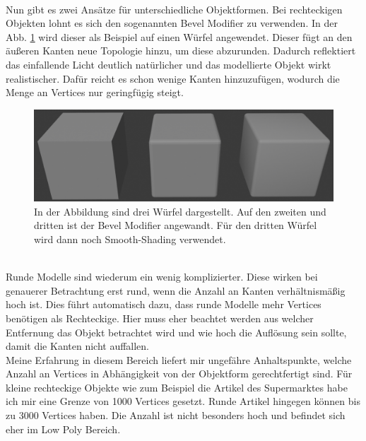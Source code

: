 \\
Nun gibt es zwei Ansätze für unterschiedliche Objektformen. Bei rechteckigen Objekten lohnt es sich den sogenannten \dq Bevel Modifier\dq{} zu verwenden. In der Abb. \ref{fig:bevel_cube} wird dieser als Beispiel auf einen Würfel angewendet. Dieser fügt an den äußeren Kanten neue Topologie hinzu, um diese abzurunden. Dadurch reflektiert das einfallende Licht deutlich natürlicher und das modellierte Objekt wirkt realistischer. Dafür reicht es schon wenige Kanten hinzuzufügen, wodurch die Menge an Vertices nur geringfügig steigt. 
\begin{figure} [ht]
	\centering
	\includegraphics[width=\linewidth,height=\textheight,keepaspectratio]{img/bevel_cube}
	\caption[Visualisierung des Bevelmodifiers]{In der Abbildung sind drei Würfel dargestellt. Auf den zweiten und dritten ist der \dq Bevel Modifier\dq{} angewandt. Für den dritten Würfel wird dann noch Smooth-Shading verwendet.}
	\label{fig:bevel_cube}
\end{figure}
\\
Runde Modelle sind wiederum ein wenig komplizierter. Diese wirken bei genauerer Betrachtung erst rund, wenn die Anzahl an Kanten verhältnismäßig hoch ist. Dies führt automatisch dazu, dass runde Modelle mehr Vertices benötigen als Rechteckige. Hier muss eher beachtet werden aus welcher Entfernung das Objekt betrachtet wird und wie hoch die Auflösung sein sollte, damit die Kanten nicht auffallen. 
\\
Meine Erfahrung in diesem Bereich liefert mir ungefähre Anhaltspunkte, welche Anzahl an Vertices in Abhängigkeit von der Objektform gerechtfertigt sind. Für kleine rechteckige Objekte wie zum Beispiel die Artikel des Supermarktes habe ich mir eine Grenze von 1000 Vertices gesetzt. Runde Artikel hingegen können bis zu 3000 Vertices haben. Die Anzahl ist nicht besonders hoch und befindet sich eher im Low Poly Bereich.


